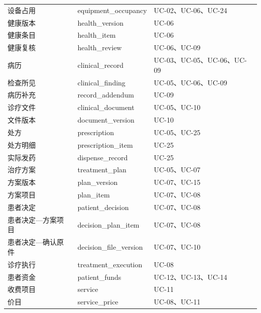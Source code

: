 \documentclass[UTF8,a4paper,zihao=-4,fontset=none]{ctexart}
\begin{document}
{\begin{tabular}{@{}>{\raggedright\arraybackslash}p{3.1cm}>{\raggedright\arraybackslash}p{6.5cm}>{\raggedright\arraybackslash}p{6.1cm}@{}}
设备占用 & equipment\_\allowbreak{}occupancy & UC-02、UC-06、UC-24 \\
健康版本 & health\_\allowbreak{}version & UC-06 \\
健康条目 & health\_\allowbreak{}item & UC-06 \\
健康复核 & health\_\allowbreak{}review & UC-06、UC-09 \\
病历 & clinical\_\allowbreak{}record & UC-03、UC-05、UC-06、UC-09 \\
检查所见 & clinical\_\allowbreak{}finding & UC-05、UC-06、UC-09 \\
病历补充 & record\_\allowbreak{}addendum & UC-09 \\
诊疗文件 & clinical\_\allowbreak{}document & UC-05、UC-10 \\
文件版本 & document\_\allowbreak{}version & UC-10 \\
处方 & prescription & UC-05、UC-25 \\
处方明细 & prescription\_\allowbreak{}item & UC-25 \\
实际发药 & dispense\_\allowbreak{}record & UC-25 \\
治疗方案 & treatment\_\allowbreak{}plan & UC-05、UC-07 \\
方案版本 & plan\_\allowbreak{}version & UC-07、UC-15 \\
方案项目 & plan\_\allowbreak{}item & UC-07、UC-08 \\
患者决定 & patient\_\allowbreak{}decision & UC-07、UC-08 \\
患者决定—方案项目 & decision\_\allowbreak{}plan\_\allowbreak{}item & UC-07、UC-08 \\
患者决定—确认原件 & decision\_\allowbreak{}file\_\allowbreak{}version & UC-07、UC-10 \\
诊疗执行 & treatment\_\allowbreak{}execution & UC-08 \\
患者资金 & patient\_\allowbreak{}funds & UC-12、UC-13、UC-14 \\
收费项目 & service & UC-11 \\
价目 & service\_\allowbreak{}price & UC-08、UC-11 \\
\bottomrule
\end{tabular}\par}
\endgroup
\clearpage
\end{document}
